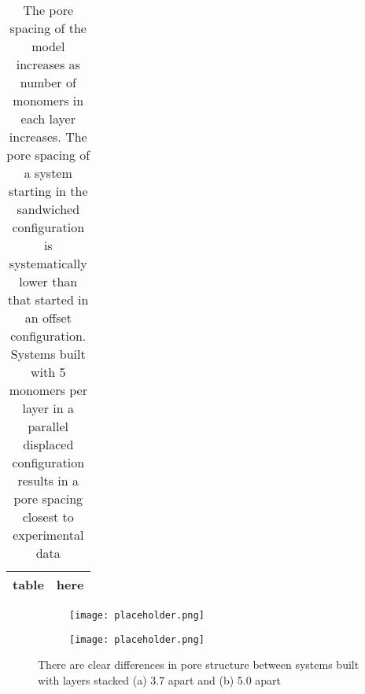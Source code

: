 \begin{table}
\centering
\begin{tabular}{|c|c|}
\hline
table & here \\
\hline
\end{tabular}
\caption{The pore spacing of the model increases as number of monomers in each layer increases. The pore spacing of a system starting in the sandwiched configuration is systematically lower than that started in an offset configuration. Systems built with 5 monomers per layer in a parallel displaced configuration results in a pore spacing closest to experimental data}\label{table:p2p} 
\end{table}
	
\begin{figure}
\centering
\begin{subfigure}{.45\textwidth}
	\centering
	\texttt{[image: placeholder.png]}
	\caption{}\label{fig:phaseA}
\end{subfigure}
\begin{subfigure}{.45\textwidth}
	\texttt{[image: placeholder.png]}
	\centering
	\caption{}\label{fig:phaseB}
\end{subfigure}
\caption{There are clear differences in pore structure between systems built with layers stacked (a) 3.7 \angstrom apart and (b) 5.0 \angstrom apart}
\label{fig:porestructures}
\end{figure}

